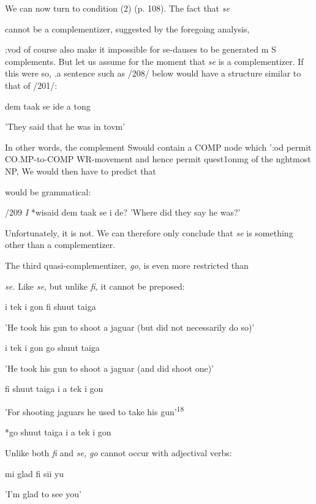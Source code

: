 We can now turn to condition (2) (p. 108). The fact that \textit{se}

cannot be a complementizer, suggested by the foregoing analysis,

;vod of course also make it impossible for se-dauses to be generated m S complements. But let us assume for the moment that \textit{se} is a com\-plementizer. If this were so, .a sentence such as /208/ below would have a structure similar to that of /201/:

\ea\label{ex:208}
 dem taak se ide a tong
\glt
\z

'They said that he was in tovm'

In other words, the complement Swould contain a COMP node which ':od permit CO.MP-to-COMP WR-movement and hence permit ques\-t1onmg of the nghtmost NP, We would then have to predict that

\ea\label{ex:209}
 would be grammatical:
\glt
\z

  


 


/209 \textit{I} *wisaid dem taak se i de? 'Where did they say he was?'

Unfortunately, it is not. We can therefore only conclude that \textit{se }is something other than a complementizer.

The third quasi-complementizer, \textit{go,} is even more restricted than

\textit{se.} Like \textit{se,} but unlike \textit{fi,} it cannot be preposed:

\ea\label{ex:210}
 i tek i gon fi shuut taiga
\glt
\z

'He took his gun to shoot a jaguar (but did not necessarily do so)'

\ea\label{ex:211}
 i tek i gon go shuut taiga
\glt
\z

'He took his gun to shoot a jaguar (and did shoot one)'

\ea\label{ex:212}
 fi shuut taiga i a tek i gon
\glt
\z

'For shooting jaguars he used to take his gun'\textsuperscript{1}\textsuperscript{8}

\ea\label{ex:213}
 *go shuut taiga i a tek i gon
\glt
\z

Unlike both \textit{fi }and \textit{se,} \textit{go} cannot occur with adjectival verbs:

\ea\label{ex:214}
 mi glad fi sii yu
\glt
\z

'I'm glad to see you'

